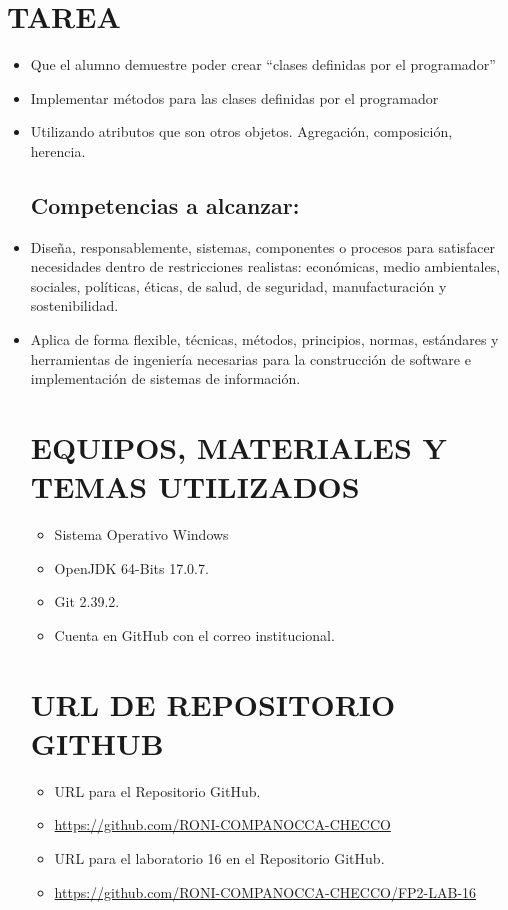 \documentclass{article}
\begin{document}
    \section{TAREA}
	\begin{itemize}	
    \subsection{Objetivos:}
		\item Que el alumno demuestre poder crear “clases definidas por el programador”
		\item Implementar métodos para las clases definidas por el programador
        \item Utilizando atributos que son otros objetos. Agregación, composición, herencia.
       
    \subsection{Competencias a alcanzar:}
		\item Diseña, responsablemente, sistemas, componentes o procesos para satisfacer necesidades dentro de restricciones realistas: económicas, medio ambientales, sociales, políticas, éticas, de salud, de seguridad, manufacturación y sostenibilidad. 
        \item Aplica de forma flexible, técnicas, métodos, principios, normas, estándares y herramientas de ingeniería necesarias para la construcción de software e implementación de sistemas de información.

    \section{EQUIPOS, MATERIALES Y TEMAS UTILIZADOS}
	\begin{itemize}
		\item Sistema Operativo Windows
		\item OpenJDK 64-Bits 17.0.7.
		\item Git 2.39.2.	
  	\item Cuenta en GitHub con el correo institucional.
	\end{itemize}

    \section{URL DE REPOSITORIO GITHUB}
	\begin{itemize}
		\item URL para el Repositorio GitHub.
		\item \url{https://github.com/RONI-COMPANOCCA-CHECCO}
		\item URL para el laboratorio 16 en el Repositorio GitHub.	
        \item \url{https://github.com/RONI-COMPANOCCA-CHECCO/FP2-LAB-16}
	\end{itemize}


\end{itemize}
\end{document}
